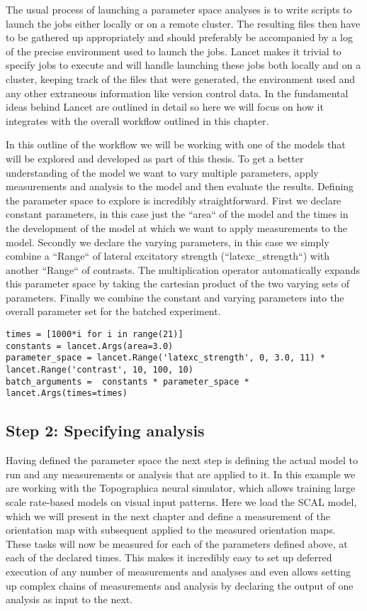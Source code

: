 The usual process of launching a parameter space analyses is to write
scripts to launch the jobs either locally or on a remote cluster. The
resulting files then have to be gathered up appropriately and should
preferably be accompanied by a log of the precise environment used to
launch the jobs. Lancet makes it trivial to specify jobs to execute
and will handle launching these jobs both locally and on a cluster,
keeping track of the files that were generated, the environment used
and any other extraneous information like version control data. In
\cite{Stevens2013a} the fundamental ideas behind Lancet are outlined
in detail so here we will focus on how it integrates with the overall
workflow outlined in this chapter.

In this outline of the workflow we will be working with one of the
models that will be explored and developed as part of this thesis. To
get a better understanding of the model we want to vary multiple
parameters, apply measurements and analysis to the model and then
evaluate the results. Defining the parameter space to explore is
incredibly straightforward. First we declare constant parameters, in
this case just the ``area`` of the model and the times in the
development of the model at which we want to apply measurements to the
model. Secondly we declare the varying parameters, in this case we
simply combine a ``Range`` of lateral excitatory strength
(``latexc\_strength``) with another ``Range`` of contrasts. The
multiplication operator automatically expands this parameter space by
taking the cartesian product of the two varying sets of
parameters. Finally we combine the constant and varying parameters
into the overall parameter set for the batched experiment.

\lstset{language=Python}
\begin{lstlisting}[frame=single]
times = [1000*i for i in range(21)]
constants = lancet.Args(area=3.0)
parameter_space = lancet.Range('latexc_strength', 0, 3.0, 11) * lancet.Range('contrast', 10, 100, 10)
batch_arguments =  constants * parameter_space * lancet.Args(times=times)
\end{lstlisting}

\subsection{Step 2: Specifying analysis}

Having defined the parameter space the next step is defining the
actual model to run and any measurements or analysis that are applied
to it. In this example we are working with the Topographica neural
simulator, which allows training large scale rate-based models on
visual input patterns. Here we load the SCAL model, which we will
present in the next chapter and define a measurement of the
orientation map with subsequent applied to the measured orientation
maps. These tasks will now be measured for each of the parameters
defined above, at each of the declared times. This makes it incredibly
easy to set up deferred execution of any number of measurements and
analyses and even allows setting up complex chains of measurements and
analysis by declaring the output of one analysis as input to the next.

